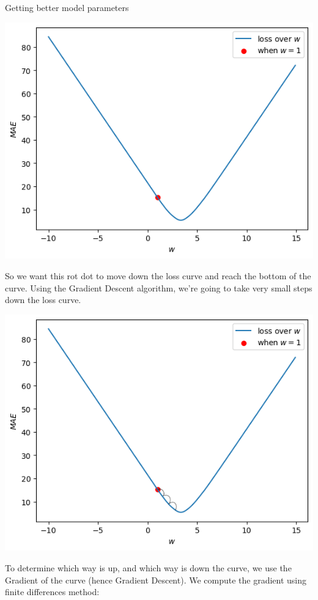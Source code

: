 \documentclass[10pt]{beamer}
\begin{document}
\begin{frame}[fragile,allowframebreaks,label=]{Getting better model parameters}
\begin{center}
\includegraphics[width=.9\linewidth]{images/loss_curve_w_1.png}
\end{center}

So we want this rot dot to move down the loss curve and reach the bottom of the
curve. Using the \alert{Gradient Descent} algorithm, we're going to take \alert{very small steps}
down the loss curve.

\begin{center}
\includegraphics[width=.9\linewidth]{images/loss_curve_w_1_with_path.png}
\end{center}

To determine which way is up, and which way is down the curve, we use the \alert{Gradient} of
the curve (hence Gradient Descent). We compute the gradient using finite differences method:


\end{frame}
\end{document}
